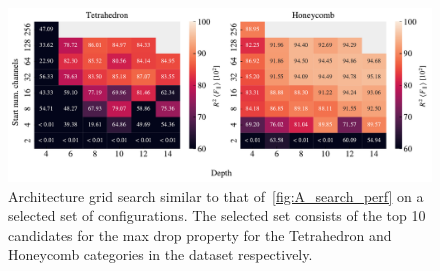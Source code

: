 \begin{figure}[!htb]
  \centering
  \includegraphics[width=0.88\linewidth]{figures/ML/A_search_compare_perf}
  \caption{Architecture grid search similar to that of~\cref{fig:A_search_perf} on a selected set of configurations. The selected set consists of the top 10 candidates for the max drop property for the Tetrahedron and Honeycomb categories in the dataset respectively.}
  \label{fig:A_search_compare}
\end{figure}  

